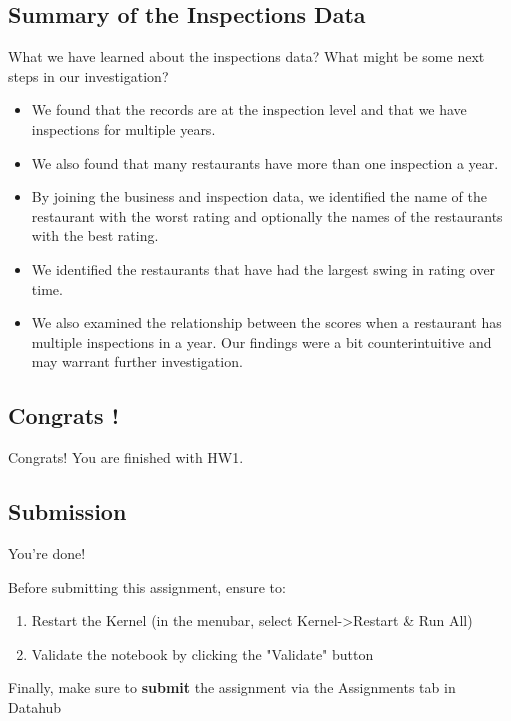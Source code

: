 \documentclass[11pt]{article}
\providecommand{\tightlist}{%
      \setlength{\itemsep}{0pt}\setlength{\parskip}{0pt}}
\begin{document}
    \subsection{Summary of the Inspections
Data}\label{summary-of-the-inspections-data}

What we have learned about the inspections data? What might be some next
steps in our investigation?

\begin{itemize}
\tightlist
\item
  We found that the records are at the inspection level and that we have
  inspections for multiple years.\\
\item
  We also found that many restaurants have more than one inspection a
  year.
\item
  By joining the business and inspection data, we identified the name of
  the restaurant with the worst rating and optionally the names of the
  restaurants with the best rating.
\item
  We identified the restaurants that have had the largest swing in
  rating over time.
\item
  We also examined the relationship between the scores when a restaurant
  has multiple inspections in a year. Our findings were a bit
  counterintuitive and may warrant further investigation.
\end{itemize}

    \subsection{Congrats !}\label{congrats}

Congrats! You are finished with HW1.

    \subsection{Submission}\label{submission}

You're done!

Before submitting this assignment, ensure to:

\begin{enumerate}
\def\labelenumi{\arabic{enumi}.}
\tightlist
\item
  Restart the Kernel (in the menubar, select
  Kernel-\textgreater{}Restart \& Run All)
\item
  Validate the notebook by clicking the "Validate" button
\end{enumerate}

Finally, make sure to \textbf{submit} the assignment via the Assignments
tab in Datahub


    
    
    
    
\end{document}
